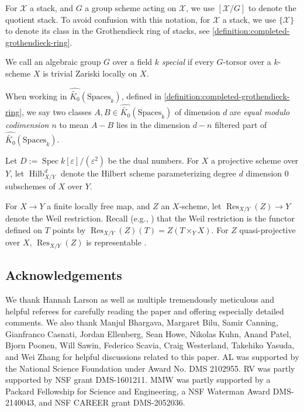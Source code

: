 \documentclass[12 pt]{amsart}
\newcommand{\rboxed}[1]{#1}
\theoremstyle{plain}
\theoremstyle{definition}
\theoremstyle{remark}
\numberwithin{equation}{section}
\newcommand\scx{\mathscr X}
\DeclareMathOperator\spec{\operatorname{Spec}}
\DeclareMathOperator\res{Res}
\newcommand\grcSpaces{\widehat{\widetilde{K_0}}(\mathrm{Spaces}_k)} %
\DeclareMathOperator\hilb{Hilb}
\begin{document}
For $\scx$ a stack, and $G$ a group scheme acting on $\scx$, we use
$\rboxed{[\scx/G]}$
to denote the quotient stack.
To avoid confusion with this notation, for $\scx$ a stack, we use $\{\scx\}$ to
denote its class in the Grothendieck ring of stacks, see
\autoref{definition:completed-grothendieck-ring}.

We call an algebraic group $G$ over a field $k$ {\em special} 
if every $G$-torsor over a $k$-scheme $X$ 
is trivial Zariski locally on $X$.

When working in $\grcSpaces$, defined in
\autoref{definition:completed-grothendieck-ring},
	we say two classes $A, B \in \grcSpaces$ of
dimension $d$ are {\em equal modulo codimension $n$} to mean $A - B$ lies in the
dimension $d - n$ filtered part of $\grcSpaces$. 

Let $\rboxed{D} := \spec k[\varepsilon]/(\varepsilon^2)$ be the dual
numbers.    For $X$ a
projective scheme over $Y$, let $\rboxed{\hilb_{X/Y}^d}$ denote the Hilbert
scheme parameterizing degree $d$ dimension $0$ subschemes of $X$ over $Y$.


For $X \rightarrow Y$ a finite locally free map, and $Z$ an $X$-scheme, let
$\rboxed{\res_{X/Y}(Z)\rightarrow Y}$ denote the Weil restriction.
Recall (e.g., \cite[\S
7.6]{BoschLR:Neron}) that the Weil
restriction is the functor defined on $T$ points by $\res_{X/Y}(Z)(T) =
Z(T\times_Y X)$.  For $Z$ quasi-projective over $X$, $\res_{X/Y}(Z)$ is
representable \cite[\S 7.6, Thm.\ 4]{BoschLR:Neron}.

\subsection{Acknowledgements}

We thank 
Hannah Larson as well as multiple tremendously meticulous and helpful referees
for carefully reading the paper and offering 
especially detailed comments.
We also thank
Manjul Bhargava, 
Margaret Bilu,
Samir Canning, 
Gianfranco Casnati, 
Jordan Ellenberg,
Sean Howe,
Nikolas Kuhn, 
Anand Patel, 
Bjorn Poonen,
Will Sawin,
Federico Scavia, 
Craig Westerland,
Takehiko Yasuda,
and Wei Zhang
for helpful discussions related to this paper.  
AL was supported by the National Science
Foundation 
under Award No.
DMS 2102955.
RV was partly supported by NSF grant DMS-1601211.
MMW was partly supported by a Packard Fellowship for Science and Engineering, a NSF Waterman Award DMS-2140043, and NSF CAREER grant DMS-2052036.
\end{document}
